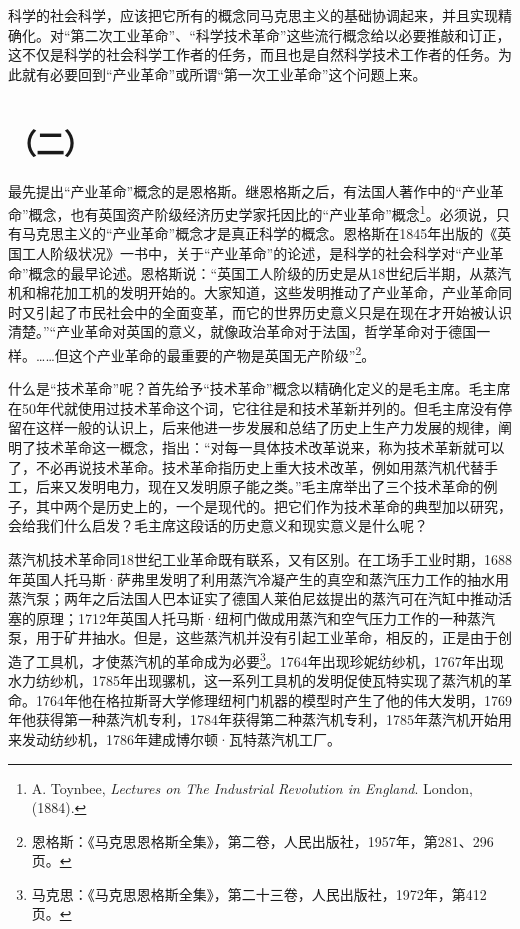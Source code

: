 科学的社会科学，应该把它所有的概念同马克思主义的基础协调起来，并且实现精确化。对“第二次工业革命”、“科学技术革命”这些流行概念给以必要推敲和订正，这不仅是科学的社会科学工作者的任务，而且也是自然科学技术工作者的任务。为此就有必要回到“产业革命”或所谓“第一次工业革命”这个问题上来。

\section*{（二）}
最先提出“产业革命”概念的是恩格斯。继恩格斯之后，有法国人著作中的“产业革命”概念，也有英国资产阶级经济历史学家托因比的“产业革命”概念\footnote{A. Toynbee, \textit{Lectures on The Industrial Revolution in England}. London, (1884).}。必须说，只有马克思主义的“产业革命”概念才是真正科学的概念。恩格斯在1845年出版的《英国工人阶级状况》一书中，关于“产业革命”的论述，是科学的社会科学对“产业革命”概念的最早论述。恩格斯说：“英国工人阶级的历史是从18世纪后半期，从蒸汽机和棉花加工机的发明开始的。大家知道，这些发明推动了产业革命，产业革命同时又引起了市民社会中的全面变革，而它的世界历史意义只是在现在才开始被认识清楚。”“产业革命对英国的意义，就像政治革命对于法国，哲学革命对于德国一样。……但这个产业革命的最重要的产物是英国无产阶级”\footnote{恩格斯：《马克思恩格斯全集》，第二卷，人民出版社，1957年，第281、296页。}。

什么是“技术革命”呢？首先给予“技术革命”概念以精确化定义的是毛主席。毛主席在50年代就使用过技术革命这个词，它往往是和技术革新并列的。但毛主席没有停留在这样一般的认识上，后来他进一步发展和总结了历史上生产力发展的规律，阐明了技术革命这一概念，指出：“对每一具体技术改革说来，称为技术革新就可以了，不必再说技术革命。技术革命指历史上重大技术改革，例如用蒸汽机代替手工，后来又发明电力，现在又发明原子能之类。”毛主席举出了三个技术革命的例子，其中两个是历史上的，一个是现代的。把它们作为技术革命的典型加以研究，会给我们什么启发？毛主席这段话的历史意义和现实意义是什么呢？

蒸汽机技术革命同18世纪工业革命既有联系，又有区别。在工场手工业时期，1688年英国人托马斯·萨弗里发明了利用蒸汽冷凝产生的真空和蒸汽压力工作的抽水用蒸汽泵；两年之后法国人巴本证实了德国人莱伯尼兹提出的蒸汽可在汽缸中推动活塞的原理；1712年英国人托马斯·纽柯门做成用蒸汽和空气压力工作的一种蒸汽泵，用于矿井抽水。但是，这些蒸汽机并没有引起工业革命，相反的，正是由于创造了工具机，才使蒸汽机的革命成为必要\footnote{马克思：《马克思恩格斯全集》，第二十三卷，人民出版社，1972年，第412页。}。1764年出现珍妮纺纱机，1767年出现水力纺纱机，1785年出现骡机，这一系列工具机的发明促使瓦特实现了蒸汽机的革命。1764年他在格拉斯哥大学修理纽柯门机器的模型时产生了他的伟大发明，1769年他获得第一种蒸汽机专利，1784年获得第二种蒸汽机专利，1785年蒸汽机开始用来发动纺纱机，1786年建成博尔顿·瓦特蒸汽机工厂。

